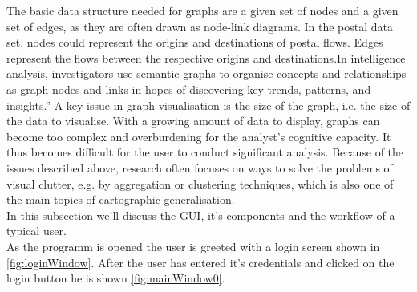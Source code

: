 \documentclass[twoside, english, draft]{Pflichtenheft}
\begin{document}


The basic data structure needed for graphs are a given set of nodes and a given set of edges, as they are often drawn
as node-link diagrams. In the postal data set, nodes could represent the origins and destinations of postal flows. Edges represent the flows between the respective origins and destinations.In intelligence analysis, investigators use semantic graphs to organise concepts and relationships as graph nodes and links in hopes of discovering key trends, patterns, and insights.” A key issue in graph visualisation is the size of the graph, i.e. the size of the data to visualise. With a growing amount of data to display, graphs can become too complex and overburdening for the analyst’s cognitive capacity. It thus becomes difficult for the user to conduct significant analysis. Because of the issues described above, research often focuses on ways to solve the problems of visual clutter, e.g. by aggregation or clustering techniques, which is also one of the main topics of cartographic generalisation.
\\
In this subsection we'll discuss the GUI, it's components and the workflow of a typical user.
\\
As the programm is opened the user is greeted with a login screen shown in \autoref{fig:loginWindow}. After the user has entered it's credentials and clicked on the login button he is shown \autoref{fig:mainWindow0}.
\\
\vfill
\end{document}
